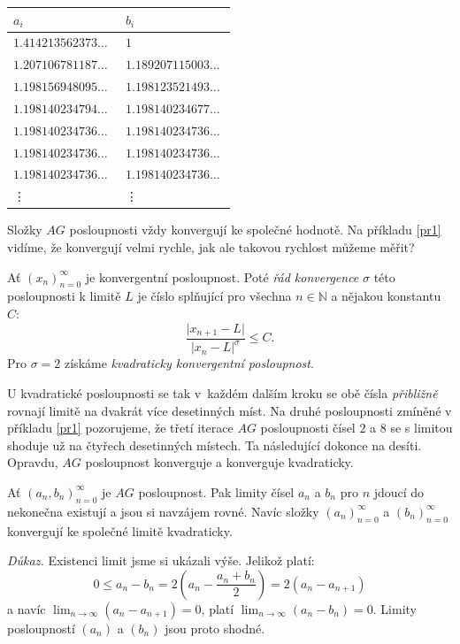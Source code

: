\documentclass[12pt]{report}
\begin{document}
\begin{priklad}
\begin{longtable}[H]{>{\raggedright\arraybackslash}p{0.3\linewidth}p{0.202\linewidth}}
\toprule
$a_i$ & $b_i$\\
\midrule
$1.414213562373\dots$ & $1$\\
$1.207106781187\dots$ & $1.189207115003\dots$\\
$1.198156948095\dots$ & $1.198123521493\dots$\\
$1.198140234794\dots$ & $1.198140234677\dots$\\
$1.198140234736\dots$ & $1.198140234736\dots$\\
$1.198140234736\dots$&  $1.198140234736\dots$\\
$1.198140234736\dots$&  $1.198140234736\dots$\\
\vdots & \vdots\\
\bottomrule 
\end{longtable}
\end{priklad}

Složky $AG$ posloupnosti vždy konvergují ke společné hodnotě. Na příkladu \ref{pr1} vidíme, že konvergují velmi rychle, jak ale takovou rychlost můžeme měřit?
\begin{definice}
Ať $(x_n)_{n=0}^{\infty}$ je konvergentní posloupnost. Poté \textit{řád konvergence} $\sigma$ této posloupnosti k limitě $L$ je číslo splňující pro všechna $n \in \mathbb{N}$ a nějakou konstantu $C$:
$$\frac{\vert x_{n+1} - L \vert}{\vert x_n - L \vert ^ \sigma} \leqslant C.$$
Pro $\sigma = 2$ získáme \textit{kvadraticky konvergentní posloupnost}. 
\end{definice}

U kvadratické posloupnosti se tak v~každém dalším kroku se obě čísla \textit{přibližně} rovnají limitě na dvakrát více desetinných míst. Na druhé posloupnosti zmíněné v příkladu \ref{pr1} pozorujeme, že třetí iterace $AG$ posloupnosti čísel $2$ a $8$ se s limitou shoduje už na čtyřech desetinných místech. Ta následující dokonce na desíti. Opravdu, $AG$ posloupnost konverguje a konverguje kvadraticky.

\begin{veta}\label{conv}
Ať $(a_n,b_n)_{n=0} ^{\infty}$ je $AG$ posloupnost. Pak limity čísel $a_n$ a $b_n$ pro $n$ jdoucí do nekonečna existují a jsou si navzájem rovné. Navíc složky $(a_n)_{n=0}^{\infty}$ a $(b_n)_{n=0}^{\infty}$ konvergují ke společné limitě kvadraticky.
\end{veta}


\noindent \textit{Důkaz.} Existenci limit jsme si ukázali výše. Jelikož platí:
$$ 0 \leqslant a_n - b_n  =  2 \left( a_n - \frac{a_n+ b_n}{2} \right) = 2 ( a_{n} - a_{n+1} )$$
a navíc $\lim_{n \rightarrow \infty} (a_n - a_{n+1}) = 0$, platí $\lim_{n \rightarrow \infty} (a_n - b_n) = 0$. Limity posloupností $(a_n)$ a $(b_n)$ jsou proto shodné.
\end{document}
